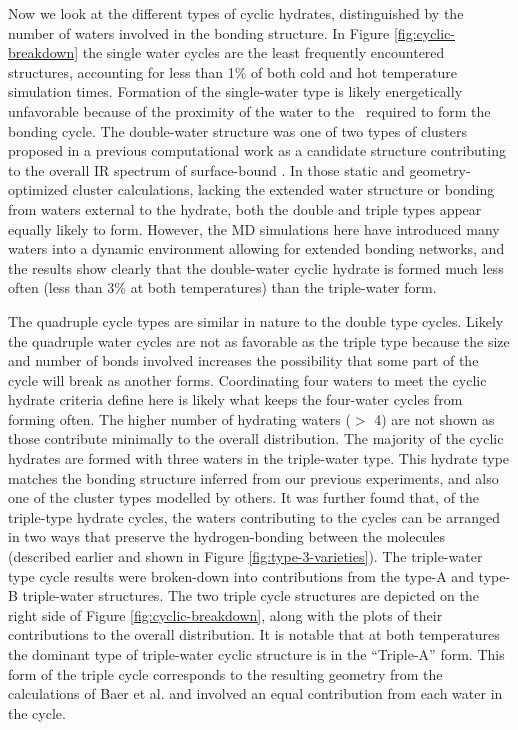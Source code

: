 \documentclass{article}
\begin{document}
Now we look at the different types of cyclic hydrates, distinguished by the number of waters involved in the bonding structure. In Figure \ref{fig:cyclic-breakdown} the single water cycles are the least frequently encountered structures, accounting for less than 1\% of both cold and hot temperature simulation times. Formation of the single-water type is likely energetically unfavorable because of the proximity of the water to the \suldiox~required to form the bonding cycle. The double-water structure was one of two types of clusters proposed in a previous computational work as a candidate structure contributing to the overall IR spectrum of surface-bound \suldiox.\cite{Baer2010} In those static and geometry-optimized cluster calculations, lacking the extended water structure or bonding from waters external to the hydrate, both the double and triple types appear equally likely to form. However, the MD simulations here have introduced many waters into a dynamic environment allowing for extended bonding networks, and the results show clearly that the double-water cyclic hydrate is formed much less often (less than 3\% at both temperatures) than the triple-water form.

The quadruple cycle types are similar in nature to the double type cycles. Likely the quadruple water cycles are not as favorable as the triple type because the size and number of bonds involved increases the possibility that some part of the cycle will break as another forms. Coordinating four waters to meet the cyclic hydrate criteria define here is likely what keeps the four-water cycles from forming often. The higher number of hydrating waters ($>$ 4) are not shown as those contribute minimally to the overall distribution. The majority of the cyclic hydrates are formed with three waters in the triple-water type. This hydrate type matches the bonding structure inferred from our previous experiments, and also one of the cluster types modelled by others.\cite{Tarbuck2005,Tarbuck2006,Baer2010} It was further found that, of the triple-type hydrate cycles, the waters contributing to the cycles can be arranged in two ways that preserve the hydrogen-bonding between the molecules (described earlier and shown in Figure \ref{fig:type-3-varieties}). The triple-water type cycle results were broken-down into contributions from the type-A and type-B triple-water structures. The two triple cycle structures are depicted on the right side of Figure \ref{fig:cyclic-breakdown}, along with the plots of their contributions to the overall distribution. It is notable that at both temperatures the dominant type of triple-water cyclic structure is in the ``Triple-A'' form. This form of the triple cycle corresponds to the resulting geometry from the calculations of Baer et al. and involved an equal contribution from each water in the cycle.\cite{Baer2010}
\end{document}
